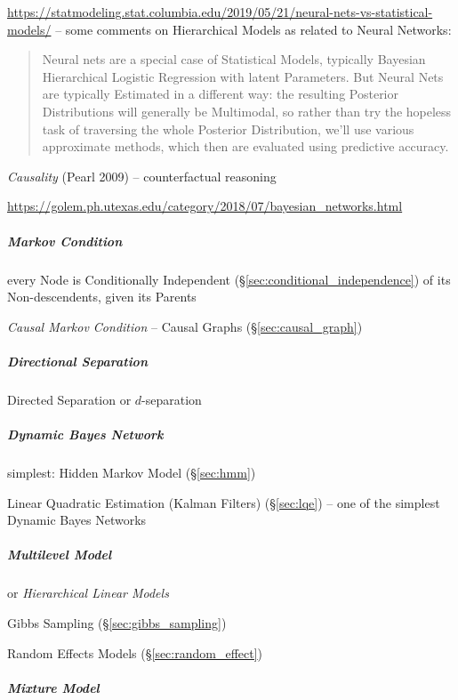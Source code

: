 \url{https://statmodeling.stat.columbia.edu/2019/05/21/neural-nets-vs-statistical-models/}
-- some comments on Hierarchical Models as related to Neural Networks:
\begin{quote}
  Neural nets are a special case of Statistical Models, typically Bayesian
  Hierarchical Logistic Regression with latent Parameters. But Neural Nets are
  typically Estimated in a different way: the resulting Posterior Distributions
  will generally be Multimodal, so rather than try the hopeless task of
  traversing the whole Posterior Distribution, we’ll use various approximate
  methods, which then are evaluated using predictive accuracy.
\end{quote}

\emph{Causality} (Pearl 2009) -- counterfactual reasoning

\url{https://golem.ph.utexas.edu/category/2018/07/bayesian_networks.html}



\subparagraph{Markov Condition}\label{sec:markov_condition}\hfill

every Node is Conditionally Independent (\S\ref{sec:conditional_independence})
of its Non-descendents, given its Parents

\emph{Causal Markov Condition}
--
Causal Graphs (\S\ref{sec:causal_graph})



\subparagraph{Directional Separation}\label{sec:directional_separation}\hfill

Directed Separation or $d$-separation



\subparagraph{Dynamic Bayes Network}\label{sec:dynamic_bayes_network}\hfill

simplest: Hidden Markov Model (\S\ref{sec:hmm})

Linear Quadratic Estimation (Kalman Filters) (\S\ref{sec:lqe}) -- one of the
simplest Dynamic Bayes Networks



\subparagraph{Multilevel Model}\label{sec:multilevel_model}\hfill

or \emph{Hierarchical Linear Models}

Gibbs Sampling (\S\ref{sec:gibbs_sampling})

Random Effects Models (\S\ref{sec:random_effect})



\subparagraph{Mixture Model}\label{sec:mixture_model}\hfill


